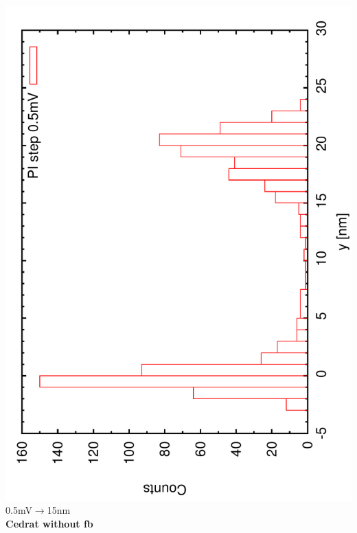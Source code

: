 \documentclass[a4paper,11pt]{book}
\begin{document}
\includegraphics[angle=-90,scale=0.15]{imagestep01a.pdf}\\
{\scriptsize 0.5mV$\rightarrow$15nm}\\
\textbf{Cedrat without fb}\\
\end{document}

